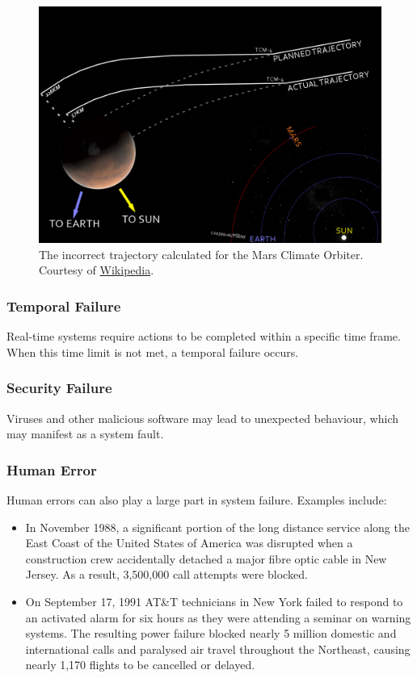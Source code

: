 \begin{figure}
\centering
\includegraphics[width=0.7\linewidth]{Mars_Climate_Orbiter_-_mishap_diagram}
\caption[Mars Climate Orbiter wrong trajectory]{The incorrect trajectory calculated for the Mars Climate Orbiter. Courtesy of \href{https://en.wikipedia.org/wiki/Mars_Climate_Orbiter\#/media/File:Mars_Climate_Orbiter_-_mishap_diagram.png}{Wikipedia}.}
\label{fig:marsclimateorbiter-mishapdiagram}
\end{figure}

\subsubsection{Temporal Failure}
Real-time systems require actions to be completed within a specific time frame. When this time limit is not met, a temporal failure occurs.

\subsubsection{Security Failure}
Viruses and other malicious software may lead to unexpected behaviour, which may manifest as a system fault. 

\subsubsection{Human Error}
Human errors can also play a large part in system failure. Examples include: \begin{itemize}
\item In November 1988, a significant portion of the long distance service along the East Coast of the United States of America was disrupted when a construction crew accidentally detached a major fibre optic cable in New Jersey. As a result, 3,500,000 call attempts were blocked. 
\item On September 17, 1991 AT\&T technicians in New York failed to respond to an activated alarm for six hours as they were attending a seminar on warning systems. The resulting power failure blocked nearly 5 million domestic and international calls and paralysed air travel throughout the Northeast, causing nearly 1,170 flights to be cancelled or delayed. 
\end{itemize}

